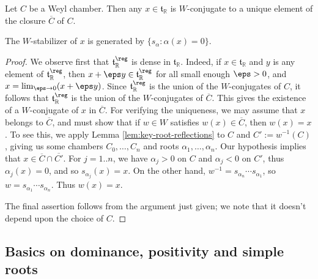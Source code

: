 \documentclass[reqno]{amsart} 
\begin{document}
\begin{corollary}\label{cor:W-conj-to-unique-dominant-element}
  Let $C$ be a Weyl chamber.  Then any $x \in \mathfrak{t}_{\mathbb{R}}$ is $W$-conjugate to a unique element of the closure $\overline{C}$ of $C$.

  The $W$-stabilizer of $x$ is generated by $\{s_\alpha : \alpha(x) = 0\}$.
\end{corollary}
\begin{proof}
  We observe first that $\mathfrak{t}_{\mathbb{R}}^{\reg}$ is dense in $\mathfrak{t}_{\mathbb{R}}$.  Indeed, if $x \in \mathfrak{t}_{\mathbb{R}}$ and $y$ is any element of $\mathfrak{t}_{\mathbb{R}}^{\reg}$, then $x + \eps y \in \mathfrak{t}_{\mathbb{R}}^{\reg}$ for all small enough $\eps > 0$, and $x = \lim_{\eps \rightarrow 0} (x + \eps y)$.  Since $\mathfrak{t}_{\mathbb{R}}^{\reg}$ is the union of the $W$-conjugates of $C$, it follows that $\mathfrak{t}_{\mathbb{R}}^{\reg}$ is the union of the $W$-conjugates of $\overline{C}$.  This gives the existence of a $W$-conjugate of $x$ in $\overline{C}$.  For verifying the uniqueness, we may assume that $x$ belongs to $\overline{C}$, and must show that if $w \in W$ satisfies $w(x) \in \overline{C}$, then $w(x) = x$.  To see this, we apply Lemma \ref{lem:key-root-reflections} to $C$ and $C' := w^{-1}(C)$, giving us some chambers $C_0,\dotsc,C_n$ and roots $\alpha_1,\dotsc,\alpha_n$.  Our hypothesis implies that $x \in \overline{C} \cap \overline{C'}$.  For $j = 1..n$, we have $\alpha_j > 0$ on $C$ and $\alpha_j < 0$ on $C'$, thus $\alpha_j(x) = 0$, and so $s_{\alpha_j}(x) = x$.  On the other hand, $w^{-1} = s_{\alpha_n} \dotsb s_{\alpha_1}$, so $w = s_{\alpha_1} \dotsb s_{\alpha_n}$.  Thus $w(x) = x$.

  The final assertion follows from the argument just given; we note that it doesn't depend upon the choice of $C$.
\end{proof}

\subsection{Basics on dominance, positivity and simple roots}
\end{document}
